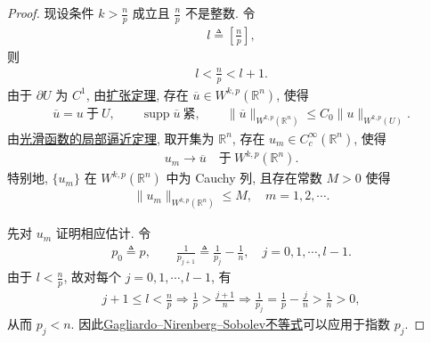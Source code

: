 \documentclass[../../main.tex]{subfiles}
\begin{document}
\begin{proof}
现设条件 $k>\frac{n}{p}$ 成立且 $\frac{n}{p}$ 不是整数. 令
\begin{align*}
l\triangleq\left[\frac{n}{p}\right],
\end{align*}
则
\begin{align*}
l<\frac{n}{p}<l+1.
\end{align*}
由于 $\partial U$ 为 $C^{1}$, 由\hyperref[theorem:ch05-扩张定理]{扩张定理}, 存在 $\overline{u}\in W^{k,p}(\mathbb{R}^{n})$, 使得
\begin{align}\label{eq::jijwIIJEI9-2}
\overline{u}=u\ \text{于}\ U,\qquad \operatorname{supp}\overline{u}\ \text{紧},\qquad
\|\overline{u}\|_{W^{k,p}(\mathbb{R}^{n})}\leqslant C_{0}\|u\|_{W^{k,p}(U)}.
\end{align}
由\hyperref[theorem:ch05-光滑函数的局部逼近定理]{光滑函数的局部逼近定理}, 取开集为 $\mathbb{R}^{n}$, 存在 $u_{m}\in C_{c}^{\infty}(\mathbb{R}^{n})$, 使得
\begin{align}\label{eq::jijwIIJEI9-2-m}
u_{m}\to\overline{u}\quad\text{于}\ W^{k,p}(\mathbb{R}^{n}).
\end{align}
特别地, $\{u_{m}\}$ 在 $W^{k,p}(\mathbb{R}^{n})$ 中为 Cauchy 列, 且存在常数 $M>0$ 使得
\begin{align*}
\|u_{m}\|_{W^{k,p}(\mathbb{R}^{n})}\leqslant M,\quad m=1,2,\cdots.
\end{align*}

先对 $u_{m}$ 证明相应估计. 令
\begin{align*}
p_{0}\triangleq p,\qquad \frac{1}{p_{j+1}}\triangleq\frac{1}{p_{j}}-\frac{1}{n},\quad j=0,1,\cdots,l-1.
\end{align*}
由于 $l<\frac{n}{p}$, 故对每个 $j=0,1,\cdots,l-1$, 有
\begin{align*}
j+1\leqslant l<\frac{n}{p}\Longrightarrow \frac{1}{p}>\frac{j+1}{n}\Longrightarrow \frac{1}{p_j}=\frac{1}{p}-\frac{j}{n}>\frac{1}{n}>0,
\end{align*}
从而 $p_{j}<n$. 因此\hyperref[theorem:Gagliardo--Nirenberg--Sobolev不等式]{Gagliardo--Nirenberg--Sobolev不等式}可以应用于指数 $p_{j}$.


\end{proof}
\end{document}
